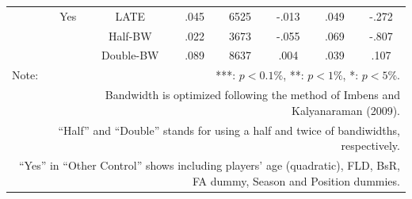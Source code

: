 \documentclass[dvipdfmx,12pt]{beamer}
\begin{document}
\begin{frame}
\begin{table}[!]
\begin{tabular}{lccccccc}
      & Yes & LATE & .045 & 6525 & -.013 & .049 & -.272 \\
      & & Half-BW & .022 & 3673 & -.055 & .069 & -.807 \\
      & &Double-BW & .089 & 8637 & .004 & .039 & .107 \\ \hline

      Note: & \multicolumn{7}{r}{***: $p<0.1\%$, **: $p<1\%$, *: $p<5\%$.} \\
      & \multicolumn{7}{r}{Bandwidth is optimized following the method of Imbens and Kalyanaraman (2009).} \\
      & \multicolumn{7}{r}{``Half'' and ``Double'' stands for using a half and twice of bandiwidths, respectively.} \\
      \multicolumn{8}{r}{
      ``Yes'' in ``Other Control'' shows including players' age (quadratic), FLD, BsR, FA dummy, Season and Position dummies.
      }
    \end{tabular}
  \end{table}
\end{frame}

\begin{frame}\frametitle{}
  
\end{frame}
\end{document}
